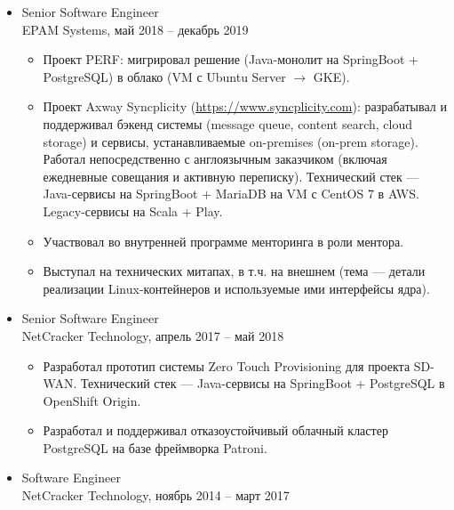 \documentclass[letterpaper, 11pt]{article}
\begin{document}
    \begin{itemize}
        \item
            Senior Software Engineer \\
            \footnotesize
                EPAM Systems, май 2018 -- декабрь 2019
            \normalsize
            
            \begin{itemize}
                \item
                    Проект PERF: мигрировал решение (Java-монолит на SpringBoot + PostgreSQL) в облако (VM с Ubuntu Server $\rightarrow$ GKE).
                \item
                    Проект Axway Syncplicity (\url{https://www.syncplicity.com}): разрабатывал и поддерживал бэкенд системы (message queue, content search, cloud storage) и сервисы, устанавливаемые on-premises (on-prem storage). Работал непосредственно с англоязычным заказчиком (включая ежедневные совещания и активную переписку). Технический стек --- Java-сервисы на SpringBoot + MariaDB на VM с CentOS 7 в AWS. Legacy-сервисы на Scala + Play.
                \item
                    Участвовал во внутренней программе менторинга в роли ментора.
                \item
                    Выступал на технических митапах, в т.ч. на внешнем (тема --- детали реализации Linux-контейнеров и используемые ими интерфейсы ядра).
            \end{itemize}

        \item
            Senior Software Engineer \\
            \footnotesize
                NetCracker Technology, апрель 2017 -- май 2018
            \normalsize
            
            \begin{itemize}
                \item
                    Разработал прототип системы Zero Touch Provisioning для проекта SD-WAN. Технический стек --- Java-сервисы на SpringBoot + PostgreSQL в OpenShift Origin.
                \item
                    Разработал и поддерживал отказоустойчивый облачный кластер PostgreSQL на базе фреймворка Patroni.
            \end{itemize}

        \item
            Software Engineer \\
            \footnotesize
                NetCracker Technology, ноябрь 2014 -- март 2017
            \normalsize


\end{itemize}
\end{document}
